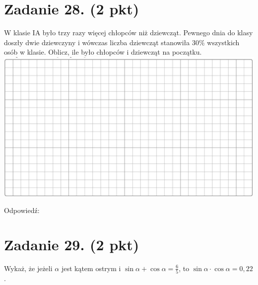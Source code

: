 \documentclass[10pt]{article}
\begin{document}
\section*{Zadanie 28. (2 pkt)}
W klasie IA było trzy razy więcej chłopców niż dziewcząt. Pewnego dnia do klasy doszły dwie dziewczyny i wówczas liczba dziewcząt stanowiła \(30 \%\) wszystkich osób w klasie. Oblicz, ile było chłopców i dziewcząt na początku.\\
\includegraphics[max width=\textwidth, center]{2024_11_21_fd9e49107d1ddcec5cd8g-09}

Odpowiedź:

\section*{Zadanie 29. (2 pkt)}
Wykaż, że jeżeli \(\alpha\) jest kątem ostrym i \(\sin \alpha+\cos \alpha=\frac{6}{5}\), to \(\sin \alpha \cdot \cos \alpha=0,22\).
\end{document}
